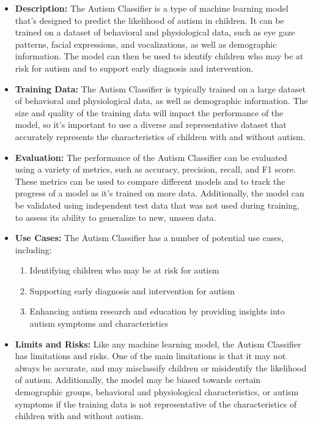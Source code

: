 \begin{itemize}
\begin{itemize}
    \item \textbf{Description:} The Autism Classifier is a type of machine learning model that's designed to predict the likelihood of autism in children. It can be trained on a dataset of behavioral and physiological data, such as eye gaze patterns, facial expressions, and vocalizations, as well as demographic information. The model can then be used to identify children who may be at risk for autism and to support early diagnosis and intervention.
    \item \textbf{Training Data:} The Autism Classifier is typically trained on a large dataset of behavioral and physiological data, as well as demographic information. The size and quality of the training data will impact the performance of the model, so it's important to use a diverse and representative dataset that accurately represents the characteristics of children with and without autism.
    \item \textbf{Evaluation:} The performance of the Autism Classifier can be evaluated using a variety of metrics, such as accuracy, precision, recall, and F1 score. These metrics can be used to compare different models and to track the progress of a model as it's trained on more data. Additionally, the model can be validated using independent test data that was not used during training, to assess its ability to generalize to new, unseen data.
    \item \textbf{Use Cases:} The Autism Classifier has a number of potential use cases, including:
        \begin{enumerate}  
            \item Identifying children who may be at risk for autism
            \item Supporting early diagnosis and intervention for autism
            \item Enhancing autism research and education by providing insights into autism symptoms and characteristics
        \end{enumerate}
    \item \textbf{Limits and Risks:} Like any machine learning model, the Autism Classifier has limitations and risks. One of the main limitations is that it may not always be accurate, and may misclassify children or misidentify the likelihood of autism. Additionally, the model may be biased towards certain demographic groups, behavioral and physiological characteristics, or autism symptoms if the training data is not representative of the characteristics of children with and without autism.

\end{itemize}
\end{itemize}
